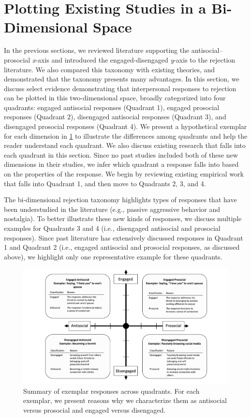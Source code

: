 \documentclass[
]{udthesis}
\begin{document}
\section{Plotting Existing Studies in a Bi-Dimensional Space}\label{plotting-existing-studies-in-a-bi-dimensional-space}

In the previous sections, we reviewed literature supporting the
antisocial--prosocial \emph{x}-axis and introduced the engaged-disengaged
\emph{y}-axis to the rejection literature. We also compared this taxonomy
with existing theories, and demonstrated that the taxonomy presents many
advantages. In this section, we discuss select evidence demonstrating
that interpersonal responses to rejection can be plotted in this
two-dimensional space, broadly categorized into four quadrants: engaged
antisocial responses (Quadrant 1), engaged prosocial responses (Quadrant
2), disengaged antisocial responses (Quadrant 3), and disengaged
prosocial responses (Quadrant 4). We present a hypothetical exemplar for
each dimension in \ref{fig:bidr-exemplars} to illustrate the
differences among quadrants and help the reader understand each
quadrant. We also discuss existing research that falls into each
quadrant in this section. Since no past studies included both of these
new dimensions in their studies, we infer which quadrant a response
falls into based on the properties of the response. We begin by
reviewing existing empirical work that falls into Quadrant 1, and then
move to Quadrants 2, 3, and 4.

The bi-dimensional rejection taxonomy highlights types of responses that
have been understudied in the literature (e.g., passive aggressive
behavior and nostalgia). To better illustrate these new kinds of
responses, we discuss multiple examples for Quadrants 3 and 4 (i.e.,
disengaged antisocial and prosocial responses). Since past literature
has extensively discussed responses in Quadrant 1 and Quadrant 2 (i.e.,
engaged antisocial and prosocial responses, as discussed above), we
highlight only one representative example for these quadrants.

\begin{figure}
\includegraphics[width=1\linewidth]{images/bidr-exemplars} \caption{Summary of exemplar responses across quadrants. For each exemplar, we present reasons why we characterize them as antisocial versus prosocial and engaged versus disengaged.}\label{fig:bidr-exemplars}
\end{figure}
\end{document}
